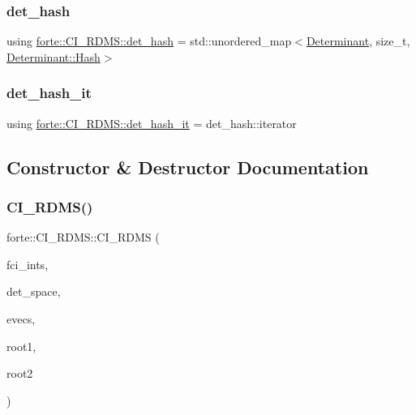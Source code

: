 \subsubsection{\texorpdfstring{det\+\_\+hash}{det\_hash}}
{\footnotesize\ttfamily using \mbox{\hyperlink{classforte_1_1_c_i___r_d_m_s_a6fe09e4dcfafed624c05462004a9de51}{forte\+::\+C\+I\+\_\+\+R\+D\+M\+S\+::det\+\_\+hash}} =  std\+::unordered\+\_\+map$<$\mbox{\hyperlink{namespaceforte_a2076c63fd7b8732004d9e1442ce527c1}{Determinant}}, size\+\_\+t, \mbox{\hyperlink{structforte_1_1_bit_array_1_1_hash}{Determinant\+::\+Hash}}$>$}

\mbox{\label{classforte_1_1_c_i___r_d_m_s_a848538093346b3724b92d39fbbaee36a}} 
\subsubsection{\texorpdfstring{det\+\_\+hash\+\_\+it}{det\_hash\_it}}
{\footnotesize\ttfamily using \mbox{\hyperlink{classforte_1_1_c_i___r_d_m_s_a848538093346b3724b92d39fbbaee36a}{forte\+::\+C\+I\+\_\+\+R\+D\+M\+S\+::det\+\_\+hash\+\_\+it}} =  det\+\_\+hash\+::iterator}



\subsection{Constructor \& Destructor Documentation}
\mbox{\label{classforte_1_1_c_i___r_d_m_s_a492dfe2daedba96524e378dff6d8881b}} 
\subsubsection{\texorpdfstring{C\+I\+\_\+\+R\+D\+M\+S()}{CI\_RDMS()}\hspace{0.1cm}{\footnotesize\ttfamily [1/2]}}
{\footnotesize\ttfamily forte\+::\+C\+I\+\_\+\+R\+D\+M\+S\+::\+C\+I\+\_\+\+R\+D\+MS (\begin{DoxyParamCaption}\item[{std\+::shared\+\_\+ptr$<$ \mbox{\hyperlink{classforte_1_1_active_space_integrals}{Active\+Space\+Integrals}} $>$}]{fci\+\_\+ints,  }\item[{const std\+::vector$<$ \mbox{\hyperlink{namespaceforte_a2076c63fd7b8732004d9e1442ce527c1}{Determinant}} $>$ \&}]{det\+\_\+space,  }\item[{psi\+::\+Shared\+Matrix}]{evecs,  }\item[{int}]{root1,  }\item[{int}]{root2 }\end{DoxyParamCaption})}

